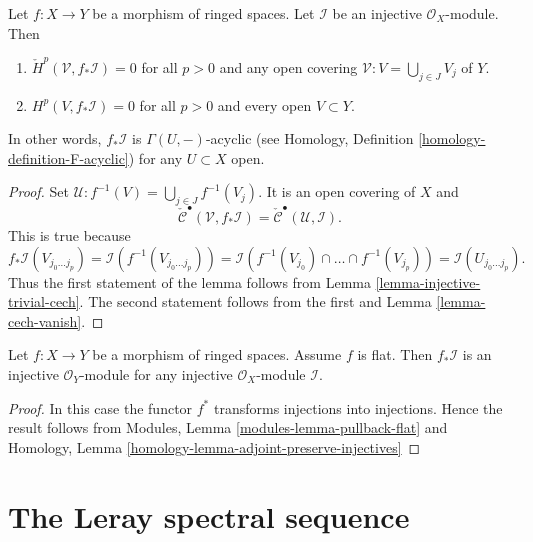 \begin{lemma}
\label{lemma-pushforward-injective}
Let $f : X \to Y$ be a morphism of ringed spaces.
Let $\mathcal{I}$ be an injective $\mathcal{O}_X$-module.
Then
\begin{enumerate}
\item $\check{H}^p(\mathcal{V}, f_*\mathcal{I}) = 0$
for all $p > 0$ and any open covering
$\mathcal{V} : V = \bigcup_{j \in J} V_j$ of $Y$.
\item $H^p(V, f_*\mathcal{I}) = 0$ for all $p > 0$ and
every open $V \subset Y$.
\end{enumerate}
In other words, $f_*\mathcal{I}$ is $\Gamma(U, -)$-acyclic
(see Homology, Definition \ref{homology-definition-F-acyclic})
for any $U \subset X$ open.
\end{lemma}

\begin{proof}
Set $\mathcal{U} : f^{-1}(V) = \bigcup_{j \in J} f^{-1}(V_j)$.
It is an open covering of $X$ and
$$
\check{\mathcal{C}}^\bullet(\mathcal{V}, f_*\mathcal{I}) =
\check{\mathcal{C}}^\bullet(\mathcal{U}, \mathcal{I}).
$$
This is true because
$$
f_*\mathcal{I}(V_{j_0 \ldots j_p})
= \mathcal{I}(f^{-1}(V_{j_0 \ldots j_p})) =
\mathcal{I}(f^{-1}(V_{j_0}) \cap \ldots \cap f^{-1}(V_{j_p}))
= \mathcal{I}(U_{j_0 \ldots j_p}).
$$
Thus the first statement of the lemma follows from
Lemma \ref{lemma-injective-trivial-cech}. The second statement
follows from the first and Lemma \ref{lemma-cech-vanish}.
\end{proof}

\begin{lemma}
\label{lemma-pushforward-injective-flat}
Let $f : X \to Y$ be a morphism of ringed spaces.
Assume $f$ is flat.
Then $f_*\mathcal{I}$ is an injective $\mathcal{O}_Y$-module
for any injective $\mathcal{O}_X$-module $\mathcal{I}$.
\end{lemma}

\begin{proof}
In this case the functor $f^*$ transforms injections into injections.
Hence the result follows from
Modules, Lemma \ref{modules-lemma-pullback-flat} and
Homology, Lemma \ref{homology-lemma-adjoint-preserve-injectives}
\end{proof}













\section{The Leray spectral sequence}
\label{section-Leray}

